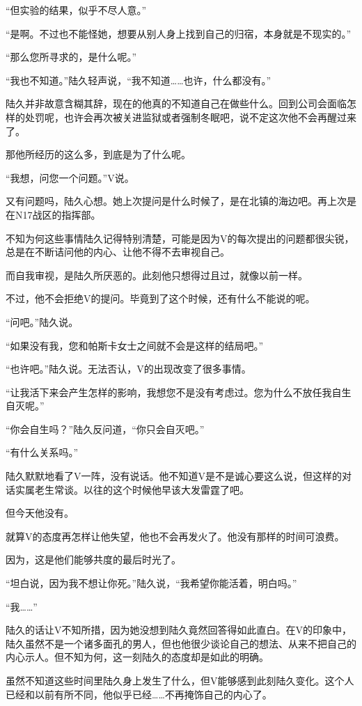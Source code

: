 “但实验的结果，似乎不尽人意。”

“是啊。不过也不能怪她，想要从别人身上找到自己的归宿，本身就是不现实的。”

“那么您所寻求的，是什么呢。”

“我也不知道。”陆久轻声说，“我不知道……也许，什么都没有。”

陆久并非故意含糊其辞，现在的他真的不知道自己在做些什么。回到公司会面临怎样的处罚呢，也许会再次被关进监狱或者强制冬眠吧，说不定这次他不会再醒过来了。

那他所经历的这么多，到底是为了什么呢。

“我想，问您一个问题。”V说。

又有问题吗，陆久心想。她上次提问是什么时候了，是在北镇的海边吧。再上次是在N17战区的指挥部。

不知为何这些事情陆久记得特别清楚，可能是因为V的每次提出的问题都很尖锐，总是在不断诘问他的内心、让他不得不去审视自己。

而自我审视，是陆久所厌恶的。此刻他只想得过且过，就像以前一样。

不过，他不会拒绝V的提问。毕竟到了这个时候，还有什么不能说的呢。

“问吧。”陆久说。

“如果没有我，您和帕斯卡女士之间就不会是这样的结局吧。”

“也许吧。”陆久说。无法否认，V的出现改变了很多事情。

“让我活下来会产生怎样的影响，我想您不是没有考虑过。您为什么不放任我自生自灭呢。”

“你会自生吗？”陆久反问道，“你只会自灭吧。”

“有什么关系吗。”

陆久默默地看了V一阵，没有说话。他不知道V是不是诚心要这么说，但这样的对话实属老生常谈。以往的这个时候他早该大发雷霆了吧。

但今天他没有。

就算V的态度再怎样让他失望，他也不会再发火了。他没有那样的时间可浪费。

因为，这是他们能够共度的最后时光了。

“坦白说，因为我不想让你死。”陆久说，“我希望你能活着，明白吗。”

“我……”

陆久的话让V不知所措，因为她没想到陆久竟然回答得如此直白。在V的印象中，陆久虽然不是一个诸多面孔的男人，但也他很少谈论自己的想法、从来不把自己的内心示人。但不知为何，这一刻陆久的态度却是如此的明确。

虽然不知道这些时间里陆久身上发生了什么，但V能够感到此刻陆久变化。这个人已经和以前有所不同，他似乎已经……不再掩饰自己的内心了。

